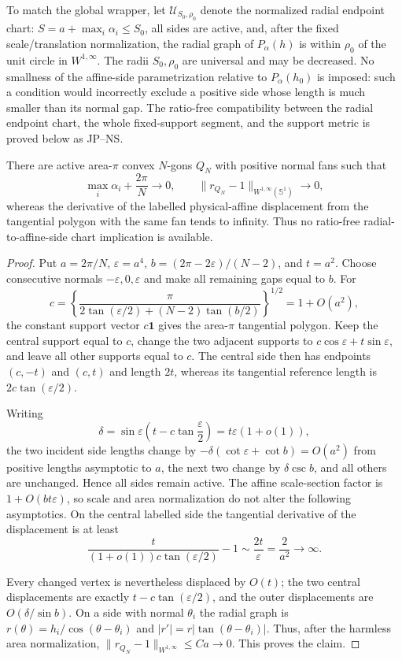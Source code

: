 To match the global wrapper, let $\mathcal U_{S_0,\rho_0}$ denote the
normalized radial endpoint chart: $S=a+\max_i\alpha_i\le S_0$, all sides
are active, and, after the fixed scale/translation normalization, the
radial graph of $P_\alpha(h)$ is within $\rho_0$ of the unit circle in
$W^{1,\infty}$.  The radii $S_0,\rho_0$ are universal and may be
decreased.  No smallness of the affine-side parametrization relative to
$P_\alpha(h_0)$ is imposed: such a condition would incorrectly exclude a
positive side whose length is much smaller than its normal gap.  The
ratio-free compatibility between the radial endpoint chart, the whole
fixed-support segment, and the support metric is proved below as JP--NS.

\begin{proposition}
\label{JP:prop:radial-not-affine}
There are active area-$\pi$ convex $N$-gons $Q_N$ with positive normal
fans such that
\[
 \max_i\alpha_i+\frac{2\pi}{N}\longrightarrow0,
 \qquad \|r_{Q_N}-1\|_{W^{1,\infty}(\mathbb S^1)}\longrightarrow0,
\]
whereas the derivative of the labelled physical-affine displacement from
the tangential polygon with the same fan tends to infinity.  Thus no
ratio-free radial-to-affine-side chart implication is available.
\end{proposition}

\begin{proof}
Put $a=2\pi/N$, $\varepsilon=a^4$,
$b=(2\pi-2\varepsilon)/(N-2)$, and $t=a^2$.  Choose consecutive normals
$-\varepsilon,0,\varepsilon$ and make all remaining gaps equal to $b$.
For
\[
 c=\left\{\frac{\pi}
 {2\tan(\varepsilon/2)+(N-2)\tan(b/2)}\right\}^{1/2}
 =1+O(a^2),
\]
the constant support vector $c\mathbf1$ gives the area-$\pi$ tangential
polygon.  Keep the central support equal to $c$, change the two adjacent
supports to $c\cos\varepsilon+t\sin\varepsilon$, and leave all other
supports equal to $c$.  The central side then has endpoints $(c,-t)$ and
$(c,t)$ and length $2t$, whereas its tangential reference length is
$2c\tan(\varepsilon/2)$.

Writing
\[
 \delta=\sin\varepsilon
 \left(t-c\tan\frac\varepsilon2\right)
 =t\varepsilon(1+o(1)),
\]
the two incident side lengths change by
$-\delta(\cot\varepsilon+\cot b)=O(a^2)$ from positive lengths
asymptotic to $a$, the next two change by $\delta\csc b$, and all others
are unchanged.  Hence all sides remain active.  The affine scale-section
factor is $1+O(bt\varepsilon)$, so scale and area normalization do not
alter the following asymptotics.  On the central labelled side the
tangential derivative of the displacement is at least
\[
 \frac{t}{(1+o(1))c\tan(\varepsilon/2)}-1
 \sim\frac{2t}{\varepsilon}=\frac2{a^2}\longrightarrow\infty.
\]

Every changed vertex is nevertheless displaced by $O(t)$; the two
central displacements are exactly
$t-c\tan(\varepsilon/2)$, and the outer displacements are
$O(\delta/\sin b)$.  On a side with normal $\theta_i$ the radial graph is
$r(\theta)=h_i/\cos(\theta-\theta_i)$ and
$|r'|=r|\tan(\theta-\theta_i)|$.  Thus, after the harmless area
normalization,
$\|r_{Q_N}-1\|_{W^{1,\infty}}\le Ca\to0$.  This proves the claim.
\end{proof}

